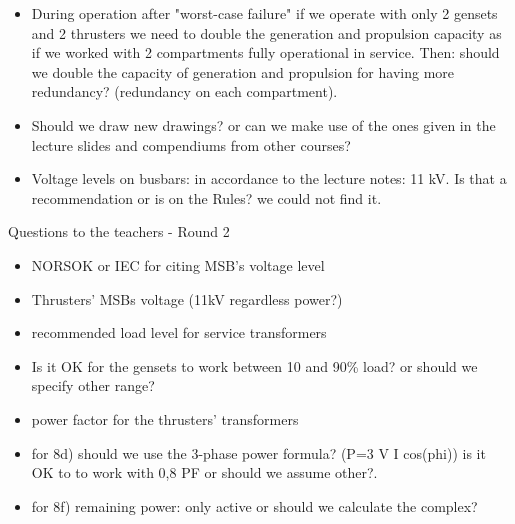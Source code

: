 \begin{itemize}
    \item During operation after "worst-case failure" if we operate with only 2 gensets and 2 thrusters we need to double the generation and propulsion capacity as if we worked with 2 compartments fully operational in service. Then: should we double the capacity of generation and propulsion for having more redundancy? (redundancy on each compartment). 
    \item Should we draw new drawings? or can we make use of the ones given in the lecture slides and compendiums from other courses?
    \item Voltage levels on busbars: in accordance to the lecture notes: 11 kV. Is that a recommendation or is on the Rules? we could not find it.
\end{itemize}


Questions to the teachers - Round 2

\begin{itemize}
    \item NORSOK or IEC for citing MSB's voltage level 
    \item Thrusters' MSBs voltage (11kV regardless power?)
    \item recommended load level for service transformers
    \item Is it OK for the gensets to work between 10 and 90\% load? or should we specify other range?
    \item power factor for the thrusters' transformers
    \item for 8d) should we use the 3-phase power formula? (P=3 V I cos(phi)) is it OK to to work with 0,8 PF or should we assume other?.
    \item for 8f) remaining power: only active or should we calculate the complex?
\end{itemize}